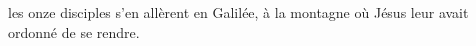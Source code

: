 \encetemps les onze disciples s’en allèrent en Galilée,
	à la montagne où Jésus leur avait ordonné de se rendre.
